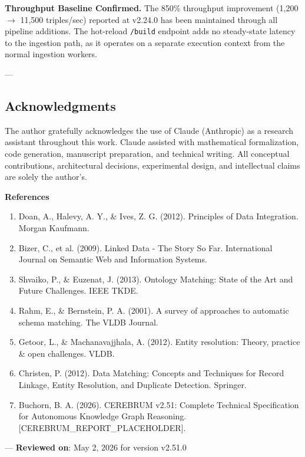 \textbf{Throughput Baseline Confirmed.} The 850\% throughput improvement (1,200 $\to$ 11,500 triples/sec) reported at v2.24.0 has been maintained through all pipeline additions. The hot-reload \texttt{/build} endpoint adds no steady-state latency to the ingestion path, as it operates on a separate execution context from the normal ingestion workers.

---
\subsection{Acknow\-ledgments}

The author gratefully ackno\-wledges the use of Claude (Anthropic) as a research assistant throughout this work. Claude assisted with mathe\-matical forma\-lization, code generation, manuscript preparation, and technical writing. All conceptual contr\-ibutions, archi\-tectural decisions, exper\-imental design, and intel\-lectual claims are solely the author's.

\textbf{References}
\begin{enumerate}
\item Doan, A., Halevy, A. Y., \& Ives, Z. G. (2012). Principles of Data Integration. Morgan Kaufmann.
\item Bizer, C., et al. (2009). Linked Data - The Story So Far. Intern\-ational Journal on Semantic Web and Information Systems.
\item Shvaiko, P., \& Euzenat, J. (2013). Ontology Matching: State of the Art and Future Challenges. IEEE TKDE.
\item Rahm, E., \& Bernstein, P. A. (2001). A survey of approaches to automatic schema matching. The VLDB Journal.
\item Getoor, L., \& Machan\-avajjhala, A. (2012). Entity resolution: Theory, practice \& open challenges. VLDB.
\item Christen, P. (2012). Data Matching: Concepts and Techniques for Record Linkage, Entity Resolution, and Duplicate Detection. Springer.
\item Buchorn, B. A. (2026). CEREBRUM v2.51: Complete Technical Specif\-ication for Autonomous Knowledge Graph Reasoning. [CEREBRUM\_REPORT\_PLACEHOLDER].

\end{enumerate}
---
\textbf{Reviewed on}: May 2, 2026 for version v2.51.0
